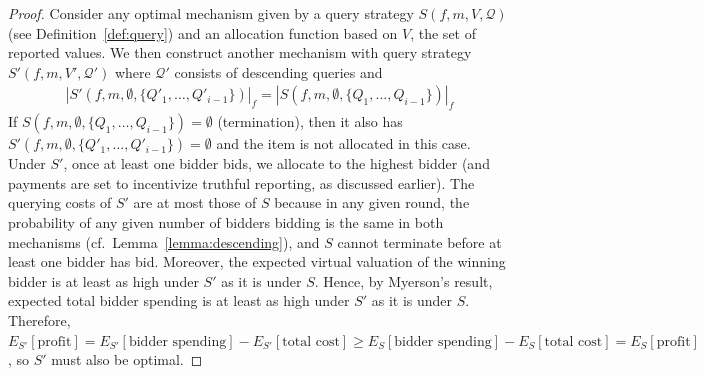 \begin{proof}
Consider any optimal mechanism given by a
query strategy $S(f, m, V, \mathcal Q)$ (see Definition~\ref{def:query}) and an
allocation function based on $V$, the set of reported values.
We then construct another mechanism
with query strategy $S'(f, m, V', \mathcal Q')$ where $\mathcal Q'$
consists of descending queries
and 
\begin{align*}
|S'(f, m, \emptyset, \{Q'_1, \ldots, Q'_{i-1}\})|_f %
  = |S(f, m, \emptyset, \{Q_1, \ldots, Q_{i-1}\})|_f
\end{align*}
If $S(f, m, \emptyset, \{Q_1, \ldots,
Q_{i-1}\})=\emptyset$ (termination), then it also has
$S'(f, m, \emptyset, \{Q'_1, \ldots, Q'_{i-1}\})=\emptyset$ 
and the item is not allocated in this case.
Under $S'$, once at least one bidder bids, we allocate to the highest
bidder (and payments are set to incentivize truthful reporting, as
discussed earlier).  The querying costs of $S'$ are at most those of $S$
because in any given round, the probability of any given number of bidders
bidding is the same in both mechanisms (cf.~Lemma~\ref{lemma:descending}), and $S$ cannot terminate before at least one bidder has bid. 
Moreover, the expected virtual valuation of the winning bidder is at
least as high under $S'$ as it is under $S$.
Hence, by Myerson's result, expected total bidder spending is at least 
as high under $S'$ as it is under $S$.
Therefore,
 $E_{S'}[\text{profit}]
= E_{S'}[\text{bidder spending}] - E_{S'}[\text{total cost}]
 \geq E_{S}[\text{bidder spending}] - E_{S}[\text{total cost}]
= E_{S}[\text{profit}]$, so $S'$ must also be optimal.

\end{proof}
